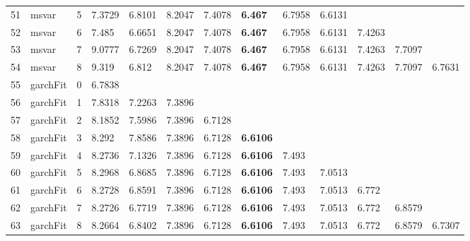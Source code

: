 \documentclass[10pt,a4paper]{article}
\begin{document}
\begin{table}[ht]
\begin{tabular}{rlrllllllllll}
  51 & msvar &     5 & 7.3729 & 6.8101 & 8.2047 & 7.4078 & \textbf{6.467} & 6.7958 & 6.6131 &  &  &  \\ 
  52 & msvar &     6 & 7.485 & 6.6651 & 8.2047 & 7.4078 & \textbf{6.467} & 6.7958 & 6.6131 & 7.4263 &  &  \\ 
  53 & msvar &     7 & 9.0777 & 6.7269 & 8.2047 & 7.4078 & \textbf{6.467} & 6.7958 & 6.6131 & 7.4263 & 7.7097 &  \\ 
  54 & msvar &     8 & 9.319 & 6.812 & 8.2047 & 7.4078 & \textbf{6.467} & 6.7958 & 6.6131 & 7.4263 & 7.7097 & 6.7631 \\ 
   \hline
55 & garchFit &     0 & 6.7838 &  &  &  &  &  &  &  &  &  \\ 
  56 & garchFit &     1 & 7.8318 & 7.2263 & 7.3896 &  &  &  &  &  &  &  \\ 
  57 & garchFit &     2 & 8.1852 & 7.5986 & 7.3896 & 6.7128 &  &  &  &  &  &  \\ 
  58 & garchFit &     3 & 8.292 & 7.8586 & 7.3896 & 6.7128 & \textbf{6.6106} &  &  &  &  &  \\ 
  59 & garchFit &     4 & 8.2736 & 7.1326 & 7.3896 & 6.7128 & \textbf{6.6106} & 7.493 &  &  &  &  \\ 
  60 & garchFit &     5 & 8.2968 & 6.8685 & 7.3896 & 6.7128 & \textbf{6.6106} & 7.493 & 7.0513 &  &  &  \\ 
  61 & garchFit &     6 & 8.2728 & 6.8591 & 7.3896 & 6.7128 & \textbf{6.6106} & 7.493 & 7.0513 & 6.772 &  &  \\ 
  62 & garchFit &     7 & 8.2726 & 6.7719 & 7.3896 & 6.7128 & \textbf{6.6106} & 7.493 & 7.0513 & 6.772 & 6.8579 &  \\ 
  63 & garchFit &     8 & 8.2664 & 6.8402 & 7.3896 & 6.7128 & \textbf{6.6106} & 7.493 & 7.0513 & 6.772 & 6.8579 & 6.7307 \\ 
   \hline
\end{tabular}
\end{table}
\end{document}
